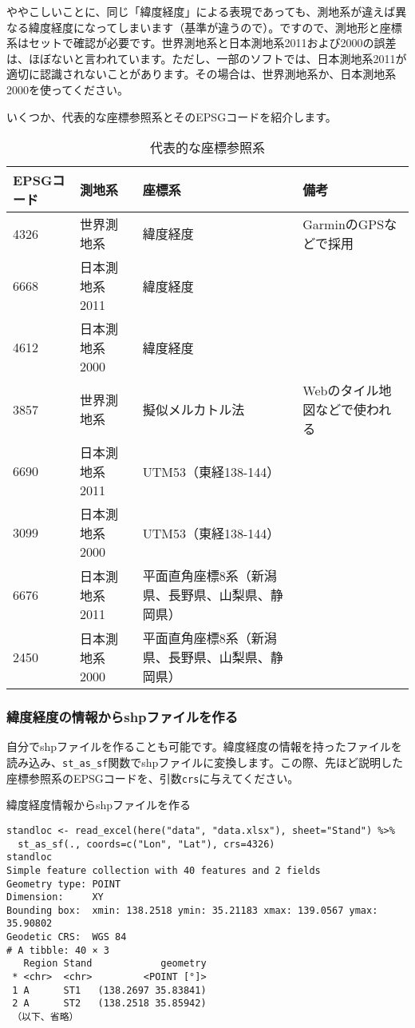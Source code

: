 ややこしいことに、同じ「緯度経度」による表現であっても、測地系が違えば異なる緯度経度になってしまいます（基準が違うので）。ですので、測地形と座標系はセットで確認が必要です。世界測地系と日本測地系2011および2000の誤差は、ほぼないと言われています。ただし、一部のソフトでは、日本測地系2011が適切に認識されないことがあります。その場合は、世界測地系か、日本測地系2000を使ってください。

いくつか、代表的な座標参照系とそのEPSGコードを紹介します。

\begin{table}
\begin{center}
\caption{代表的な座標参照系}
\label{epsg}
\begin{tabularx}{\textwidth}{lXXX} \toprule
EPSGコード & 測地系 & 座標系 & 備考 \\ \midrule
4326 & 世界測地系 & 緯度経度 & GarminのGPSなどで採用 \\ 
6668 & 日本測地系2011 & 緯度経度 &  \\
4612 & 日本測地系2000 & 緯度経度 &  \\
3857 &  世界測地系 & 擬似メルカトル法 & Webのタイル地図などで使われる  \\
6690 & 日本測地系2011 & UTM53（東経138-144） &  \\
3099 & 日本測地系2000 & UTM53（東経138-144） &  \\
6676 & 日本測地系2011 & 平面直角座標8系（新潟県、長野県、山梨県、静岡県） &  \\
2450 & 日本測地系2000 & 平面直角座標8系（新潟県、長野県、山梨県、静岡県） &  \\ \bottomrule
\end{tabularx}
\end{center}
\end{table}

    \subsubsection{緯度経度の情報からshpファイルを作る}
自分でshpファイルを作ることも可能です。緯度経度の情報を持ったファイルを読み込み、\verb|st_as_sf|関数でshpファイルに変換します。この際、先ほど説明した座標参照系のEPSGコードを、引数\texttt{crs}に与えてください。
\begin{itembox}[l]{緯度経度情報からshpファイルを作る}
\begin{verbatim}
standloc <- read_excel(here("data", "data.xlsx"), sheet="Stand") %>%
  st_as_sf(., coords=c("Lon", "Lat"), crs=4326)
standloc
Simple feature collection with 40 features and 2 fields
Geometry type: POINT
Dimension:     XY
Bounding box:  xmin: 138.2518 ymin: 35.21183 xmax: 139.0567 ymax: 35.90802
Geodetic CRS:  WGS 84
# A tibble: 40 × 3
   Region Stand            geometry
 * <chr>  <chr>         <POINT [°]>
 1 A      ST1   (138.2697 35.83841)
 2 A      ST2   (138.2518 35.85942)
 （以下、省略）
\end{verbatim}
\end{itembox}

